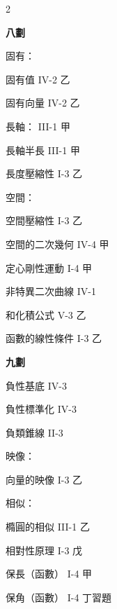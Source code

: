 \begin{multicols}{2}
\vspace{0.8em}
\begin{center}
\textbf{\large 八\quad 劃}
\end{center}

\noindent 固有：\par
\noindent\hspace*{1.5em} 固有值 \hfill IV-2 乙\par
\noindent\hspace*{1.5em} 固有向量 \hfill IV-2 乙\par
\noindent 長軸： \hfill III-1 甲\par
\noindent\hspace*{1.5em} 長軸半長 \hfill III-1 甲\par
\noindent 長度壓縮性 \hfill I-3 乙\par
\noindent 空間：\par
\noindent\hspace*{1.5em} 空間壓縮性 \hfill I-3 乙\par
\noindent\hspace*{1.5em} 空間的二次幾何 \hfill IV-4 甲\par
\noindent 定心剛性運動 \hfill I-4 甲\par
\noindent 非特異二次曲線 \hfill IV-1\par
\noindent 和化積公式 \hfill V-3 乙\par
\noindent 函數的線性條件 \hfill I-3 乙\par

\vspace{0.8em}
\begin{center}
\textbf{\large 九\quad 劃}
\end{center}

\noindent 負性基底 \hfill IV-3\par
\noindent 負性標準化 \hfill IV-3\par
\noindent 負類錐線 \hfill II-3\par
\noindent 映像：\par
\noindent\hspace*{1.5em} 向量的映像 \hfill I-3 乙\par
\noindent 相似：\par
\noindent\hspace*{1.5em} 橢圓的相似 \hfill III-1 乙\par
\noindent 相對性原理 \hfill I-3 戊\par
\noindent 保長（函數） \hfill I-4 甲\par
\noindent 保角（函數） \hfill I-4 丁習題\par


\end{multicols}
